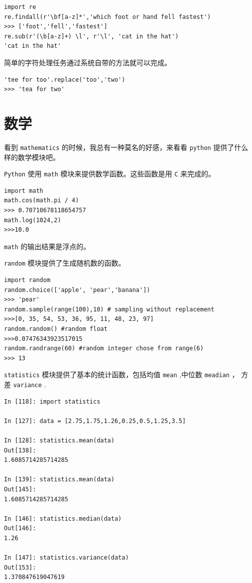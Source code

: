 \documentclass[10pt,a4paper,UTF8]{article}
\begin{document}
\begin{verbatim}
import re
re.findall(r'\bf[a-z]*','which foot or hand fell fastest')
>>> ['foot','fell','fastest']
re.sub(r'(\b[a-z]+) \l', r'\l', 'cat in the hat')
'cat in the hat'
\end{verbatim}

简单的字符处理任务通过系统自带的方法就可以完成。
\begin{verbatim}
'tee for too'.replace('too','two')
>>> 'tea for two'
\end{verbatim}
\section{数学}
\label{sec:org702ccd3}


看到 \texttt{mathematics} 的时候，我总有一种莫名的好感，来看看 \texttt{python} 提供了什么样的数学模块吧。

\texttt{Python} 使用 \texttt{math} 模块来提供数学函数。这些函数是用 \texttt{C} 来完成的。

\begin{verbatim}
import math
math.cos(math.pi / 4)
>>> 0.70710678118654757
math.log(1024,2)
>>>10.0
\end{verbatim}

\texttt{math} 的输出结果是浮点的。

\texttt{random} 模块提供了生成随机数的函数。
\begin{verbatim}
import random
random.choice(['apple', 'pear','banana'])
>>> 'pear'
random.sample(range(100),10) # sampling without replacement
>>>[0, 35, 54, 53, 36, 95, 11, 48, 23, 97]
random.random() #random float
>>>0.07476343923517015
random.randrange(60) #random integer chose from range(6)
>>> 13
\end{verbatim}

\texttt{statistics} 模块提供了基本的统计函数，包括均值 \texttt{mean} ,中位数 \texttt{meadian} ， 方差 \texttt{variance} .

\begin{verbatim}
In [118]: import statistics

In [127]: data = [2.75,1.75,1.26,0.25,0.5,1.25,3.5]

In [128]: statistics.mean(data)
Out[138]:
1.6085714285714285

In [139]: statistics.mean(data)
Out[145]:
1.6085714285714285

In [146]: statistics.median(data)
Out[146]:
1.26

In [147]: statistics.variance(data)
Out[153]:
1.370847619047619
\end{verbatim}
\end{document}
